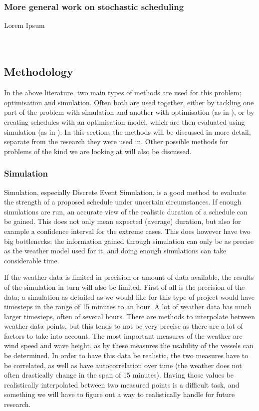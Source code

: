 \documentclass[a4paper,12pt]{article}
\begin{document}
\subsubsection{More general work on stochastic scheduling} \label{sss:stoch}
Lorem Ipsum \\
\cite{herroelen2005project} \\
\cite{sevaux2002genetic} \\
\cite{artigues2000polynomial}

\subsection{Methodology} \label{ss:meth}
In the above literature, two main types of methods are used for this problem; optimisation and simulation. Often both are used together, either by tackling one part of the problem with simulation and another with optimisation (as in \cite{barlow2018mixed}), or by creating schedules with an optimisation model, which are then evaluated using simulation (as in \cite{kerkhove2017optimised}). In this sections the methods will be discussed in more detail, separate from the research they were used in. Other possible methods for problems of the kind we are looking at will also be discussed. 

\bigskip

\subsubsection{Simulation} \label{ss:sim}
Simulation, especially Discrete Event Simulation, is a good method to evaluate the strength of a proposed schedule under uncertain circumstances. If enough simulations are run, an accurate view of the realistic duration of a schedule can be gained. This does not only mean expected (average) duration, but also for example a confidence interval for the extreme cases. This does however have two big bottlenecks; the information gained through simulation can only be as precise as the weather model used for it, and doing enough simulations can take considerable time. 

\bigskip

If the weather data is limited in precision or amount of data available, the results of the simulation in turn will also be limited. First of all is the precision of the data; a simulation as detailed as we would like for this type of project would have timesteps in the range of 15 minutes to an hour. A lot of weather data has much larger timesteps, often of several hours. There are methods to interpolate between weather data points, but this tends to not be very precise as there are a lot of factors to take into account. The most important measures of the weather are wind speed and wave height, as by these measures the usability of the vessels can be determined. In order to have this data be realistic, the two measures have to be correlated, as well as have autocorrelation over time (the weather does not often drastically change in the span of 15 minutes). Having those values be realistically interpolated between two measured points is a difficult task, and something we will have to figure out a way to realistically handle for future research.
\end{document}

